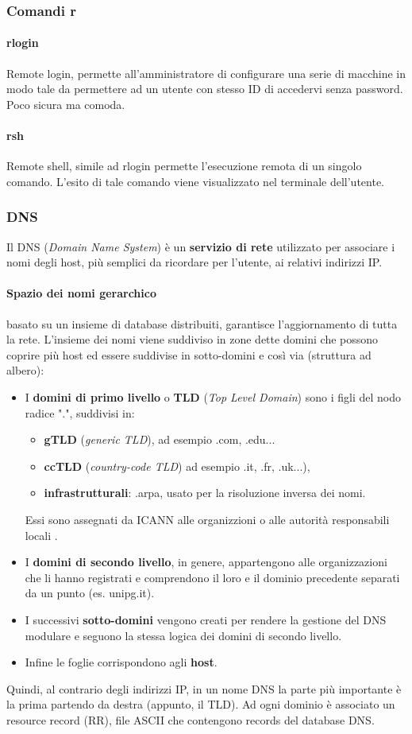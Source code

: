 \documentclass[a4paper,11pt]{article}
\def\vedi#1{\nameref{#1}}
\begin{document}
\subsubsection{Comandi r}
\paragraph{rlogin} Remote login, permette all'amministratore di configurare una serie di macchine in modo tale da permettere ad un utente con stesso ID di accedervi senza password. Poco sicura ma comoda.
\paragraph{rsh}
Remote shell, simile ad rlogin permette l'esecuzione remota di un singolo comando. L'esito di tale comando viene visualizzato nel terminale dell'utente.
\newpage

\subsubsection{DNS}
Il DNS (\textit{Domain Name System}) è un \textbf{servizio di rete} utilizzato per associare i nomi degli host, più semplici da ricordare per l'utente, ai relativi indirizzi IP.
\paragraph{Spazio dei nomi gerarchico} basato su un insieme di database distribuiti, garantisce l'aggiornamento di tutta la rete. L'insieme dei nomi viene suddiviso in zone dette domini che possono coprire più host ed essere suddivise in sotto-domini e così via (struttura ad albero):
\begin{itemize}
\item I \textbf{domini di primo livello} o \textbf{TLD} (\textit{Top Level Domain}) sono i figli del nodo radice ".", suddivisi in: 
\begin{itemize}
\item \textbf{gTLD} (\textit{generic TLD}), ad esempio .com, .edu...
\item \textbf{ccTLD} (\textit{country-code TLD}) ad esempio .it, .fr, .uk...),
\item \textbf{infrastrutturali}: .arpa, usato per la risoluzione inversa dei nomi. 
\end{itemize}
Essi sono assegnati da ICANN alle organizzioni o alle autorità responsabili locali .
\item I \textbf{domini di secondo livello}, in genere, appartengono alle organizzazioni che li hanno registrati e comprendono il loro e il dominio precedente separati da un punto (es. unipg.it).
\item I successivi \textbf{sotto-domini} vengono creati per rendere la gestione del DNS modulare e seguono la stessa logica dei domini di secondo livello.
\item Infine le foglie corrispondono agli \textbf{host}. 
\end{itemize}
Quindi, al contrario degli indirizzi IP, in un nome DNS la parte più importante è la prima partendo da destra (appunto, il TLD).
Ad ogni dominio è associato un resource record (RR), file ASCII che contengono records del database DNS.  %
\end{document}
